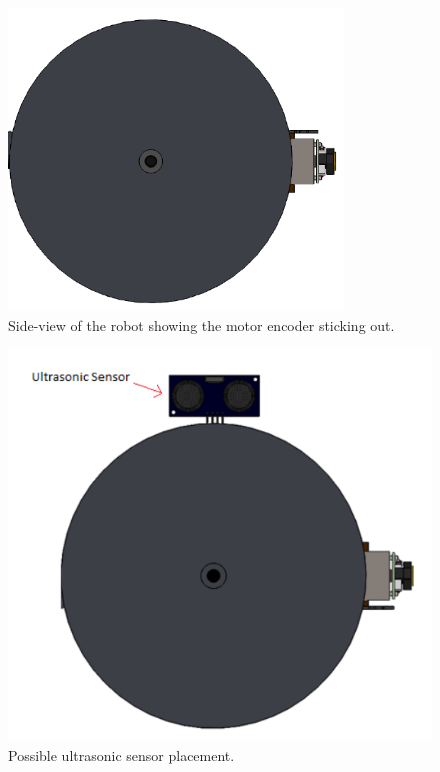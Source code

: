 \documentclass[ece]{uw-wkrpt}
\begin{document}
\begin{figure}[!htb]
    \centering
    \includegraphics[width=3.5in]{res/mech1}
    \caption[Side-view of the robot showing the motor encoder]
          {Side-view of the robot showing the motor encoder sticking out.}
    \label{fig:mech1}
\end{figure}

\break

\begin{figure}[!htb]
    \centering
    \includegraphics[width=4.5in]{res/mech2}
    \caption[Possible ultrasonic sensor placement]
          {Possible ultrasonic sensor placement.}
    \label{fig:mech2}
\end{figure}
\end{document}
